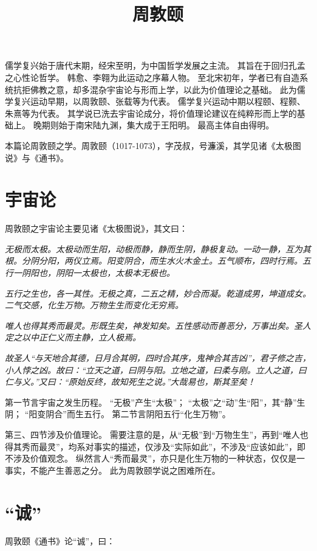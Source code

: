 \documentclass[11pt]{article}
\title{周敦颐}
\date{}
\begin{document}
  \maketitle

  \linenumbers

儒学复兴始于唐代末期，经宋至明，为中国哲学发展之主流。
其旨在于回归孔孟之心性论哲学。
韩愈、李翱为此运动之序幕人物。
至北宋初年，学者已有自造系统抗拒佛教之意，却多混杂宇宙论与形而上学，以此为价值理论之基础。
此为儒学复兴运动早期，以周敦颐、张载等为代表。
儒学复兴运动中期以程颐、程颢、朱熹等为代表。
其学说已洗去宇宙论成分，将价值理论建议在纯粹形而上学的基础上。
晚期则始于南宋陆九渊，集大成于王阳明。
最高主体自由得明。

\newline

本篇论周敦颐之学。周敦颐（1017-1073），字茂叔，号濂溪，其学见诸《太极图说》与《通书》。

\section{宇宙论}
周敦颐之宇宙论主要见诸《太极图说》，其文曰：

\textit{无极而太极。太极动而生阳，动极而静，静而生阴，静极复动。一动一静，互为其根。分阴分阳，两仪立焉。阳变阴合，而生水火木金土。五气顺布，四时行焉。五行一阴阳也，阴阳一太极也，太极本无极也。}

\textit{五行之生也，各一其性。无极之真，二五之精，妙合而凝。乾道成男，坤道成女。二气交感，化生万物。万物生生而变化无穷焉。}

\textit{唯人也得其秀而最灵。形既生矣，神发知矣。五性感动而善恶分，万事出矣。圣人定之以中正仁义而主静，立人极焉。}

\textit{故圣人“与天地合其德，日月合其明，四时合其序，鬼神合其吉凶”，君子修之吉，小人悖之凶。故曰：“立天之道，曰阴与阳。立地之道，曰柔与刚。立人之道，曰仁与义。”又曰：“原始反终，故知死生之说。”大哉易也，斯其至矣！}

第一节言宇宙之发生历程。
“无极”产生“太极”；
“太极”之“动”生“阳”，其“静”生阴；
“阳变阴合”而生五行。
第二节言阴阳五行“化生万物”。

\newline

第三、四节涉及价值理论。
需要注意的是，从“无极”到“万物生生”，再到“唯人也得其秀而最灵”，均系对事实的描述，仅涉及“实际如此”，不涉及“应该如此”，即不涉及价值观念。
纵然言人“秀而最灵”，亦只是化生万物的一种状态，仅仅是一事实，不能产生善恶之分。
此为周敦颐学说之困难所在。

\section{“诚”}
周敦颐《通书》论“诚”，曰：
\end{document}
